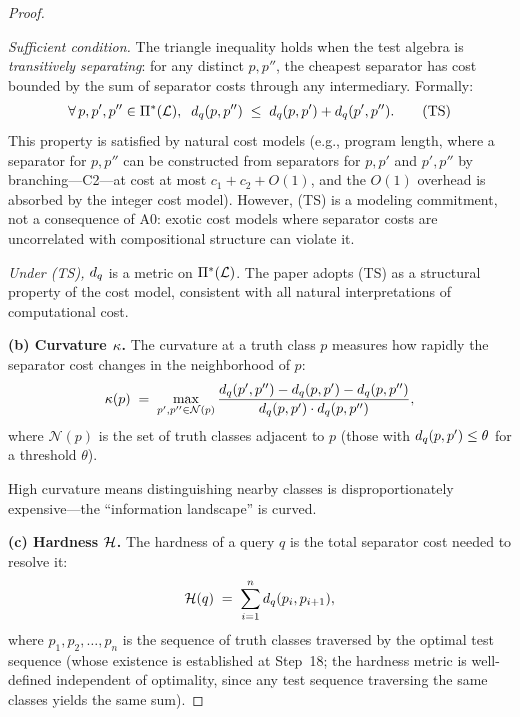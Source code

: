 \begin{proof}
\begin{itemize}[nosep]
        \emph{Sufficient condition.}  The triangle inequality holds when
        the test algebra is \emph{transitively separating}: for any
        distinct $p, p''$, the cheapest separator has cost bounded by the
        sum of separator costs through any intermediary.  Formally:
        \[
          \forall\, p, p', p'' \in \Pi^*(\mathcal{L}),\;\;
          d_q(p, p'') \;\leq\;
          d_q(p, p') + d_q(p', p'').
          \tag{TS}
        \]
        This property is satisfied by natural cost models (e.g., program
        length, where a separator for $p, p''$ can be constructed from
        separators for $p, p'$ and $p', p''$ by branching---C2---at cost
        at most $c_1 + c_2 + O(1)$, and the $O(1)$ overhead is absorbed
        by the integer cost model).  However, (TS) is a modeling
        commitment, not a consequence of A0: exotic cost models where
        separator costs are uncorrelated with compositional structure
        can violate it.

        \emph{Under (TS),} $d_q$ is a metric on $\Pi^*(\mathcal{L})$.
        The paper adopts (TS) as a structural property of the cost model,
        consistent with all natural interpretations of computational cost.
\end{itemize}

\textbf{(b) Curvature $\kappa$.}
The curvature at a truth class $p$ measures how rapidly the separator
cost changes in the neighborhood of $p$:
\[
  \kappa(p) \;=\; \max_{p', p'' \in \mathcal{N}(p)}
    \frac{d_q(p', p'') - d_q(p, p') - d_q(p, p'')}
         {d_q(p, p') \cdot d_q(p, p'')},
\]
where $\mathcal{N}(p)$ is the set of truth classes adjacent to $p$ (those
with $d_q(p, p') \leq \theta$ for a threshold $\theta$).

High curvature means distinguishing nearby classes is disproportionately
expensive---the ``information landscape'' is curved.

\textbf{(c) Hardness $\mathcal{H}$.}
The hardness of a query $q$ is the total separator cost needed to resolve it:
\[
  \mathcal{H}(q) \;=\; \sum_{i=1}^{n} d_q(p_i, p_{i+1}),
\]
where $p_1, p_2, \ldots, p_n$ is the sequence of truth classes traversed
by the optimal test sequence (whose existence is established at Step~18;
the hardness metric is well-defined independent of optimality, since any
test sequence traversing the same classes yields the same sum).

\end{proof}

